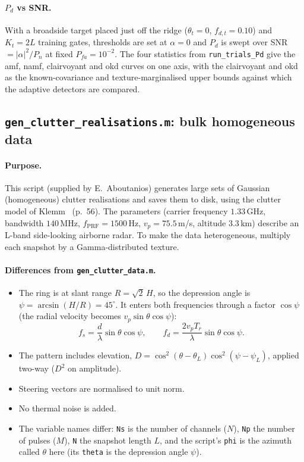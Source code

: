 \documentclass{article}
\begin{document}
\paragraph{$P_d$ vs SNR.} With a broadside target placed just off the ridge ($\theta_t=0$, $f_{d,t}=0.10$) and $K_t=2L$ training gates, thresholds are set at $\alpha=0$ and $P_d$ is swept over SNR $=|\alpha|^2/P_n$ at fixed $P_{fa}=10^{-2}$. The four statistics from \texttt{run\_trials\_Pd} give the \gls{amf}, \gls{namf}, clairvoyant and \gls{okd} curves on one axis, with the clairvoyant and \gls{okd} as the known-covariance and texture-marginalised upper bounds against which the adaptive detectors are compared.

\subsection{\texttt{gen\_clutter\_realisations.m}: bulk homogeneous data}\label{sec:code:gcr}

\paragraph{Purpose.} This script (supplied by E.~Aboutanios) generates large sets of Gaussian (homogeneous) clutter realisations and saves them to disk, using the clutter model of Klemm~\cite{Klemm2002} (p.~56). The parameters (carrier frequency $1.33$\,GHz, bandwidth $140$\,MHz, $f_\mathrm{PRF}=1500$\,Hz, $v_p=75.5$\,m/s, altitude $3.3$\,km) describe an L-band side-looking airborne radar. To make the data heterogeneous, multiply each snapshot by a Gamma-distributed texture.

\paragraph{Differences from \texttt{gen\_clutter\_data.m}.}
\begin{itemize}
  \item The ring is at slant range $R=\sqrt2\,H$, so the depression angle is $\psi=\arcsin(H/R)=45^\circ$. It enters both frequencies through a factor $\cos\psi$ (the radial velocity becomes $v_p\sin\theta\cos\psi$):
        \[
          f_s=\frac{d}{\lambda}\sin\theta\cos\psi, \qquad
          f_d=\frac{2v_pT_r}{\lambda}\sin\theta\cos\psi.
        \]
  \item The pattern includes elevation, $D=\cos^2(\theta-\theta_L)\cos^2(\psi-\psi_L)$, applied two-way ($D^2$ on amplitude).
  \item Steering vectors are normalised to unit norm.
  \item No thermal noise is added.
  \item The variable names differ: \texttt{Ns} is the number of channels ($N$), \texttt{Np} the number of pulses ($M$), \texttt{N} the snapshot length $L$, and the script's \texttt{phi} is the azimuth called $\theta$ here (its \texttt{theta} is the depression angle $\psi$).
\end{itemize}
\end{document}
